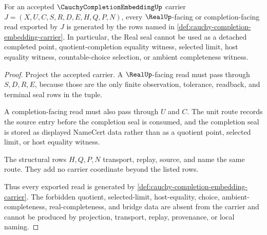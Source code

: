 \begin{theorem}
\label{thm:cauchy-completion-embedding-real-seal-nonescape}
For an accepted $\CauchyCompletionEmbeddingUp$ carrier $J=(X,U,C,S,R,D,E,H,Q,P,N)$, every $\RealUp$-facing or completion-facing read exported by $J$ is generated by the rows named in \autoref{def:cauchy-completion-embedding-carrier}. In particular, the Real seal cannot be used as a detached completed point, quotient-completion equality witness, selected limit, host equality witness, countable-choice selection, or ambient completeness witness.
\end{theorem}
\begin{proof}
Project the accepted carrier. A $\RealUp$-facing read must pass through $S,D,R,E$, because those are the only finite observation, tolerance, readback, and terminal seal rows in the tuple.

A completion-facing read must also pass through $U$ and $C$. The unit route records the source entry before the completion seal is consumed, and the completion seal is stored as displayed NameCert data rather than as a quotient point, selected limit, or host equality witness.

The structural rows $H,Q,P,N$ transport, replay, source, and name the same route. They add no carrier coordinate beyond the listed rows.

Thus every exported read is generated by \autoref{def:cauchy-completion-embedding-carrier}. The forbidden quotient, selected-limit, host-equality, choice, ambient-completeness, real-completeness, and bridge data are absent from the carrier and cannot be produced by projection, transport, replay, provenance, or local naming.
\end{proof}

\begin{closurestatus}{\CauchyCompletionEmbeddingUp}
  \theoryclosure{\seedClosure}
  \formalstatus{\unformalizedV}
\end{closurestatus}
